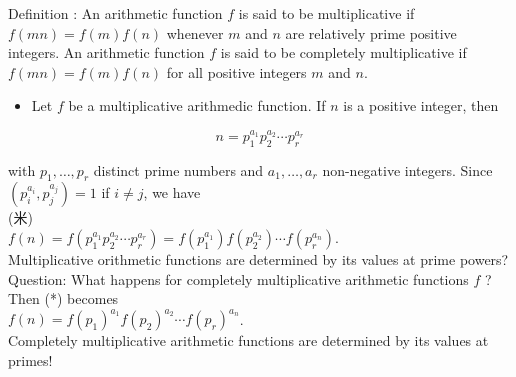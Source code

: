\documentclass[10pt]{article}
\begin{document}
Definition : An arithmetic function $f$ is said to be multiplicative if $f(m n)=f(m) f(n)$ whenever $m$ and $n$ are relatively prime positive integers. An arithmetic function $f$ is said to be completely multiplicative if $f(m n)=f(m) f(n)$ for all positive integers $m$ and $n$.

\begin{itemize}
  \item Let $f$ be a multiplicative arithmedic function. If $n$ is a positive integer, then
\end{itemize}


\begin{equation*}
n=p_{1}^{a_{1}} p_{2}^{a_{2}} \cdots p_{r}^{a_{r}} \tag{10}
\end{equation*}


with $p_{1}, \ldots, p_{r}$ distinct prime numbers and $a_{1}, \ldots, a_{r}$ non-negative integers. Since $\left(p_{i}^{a_{i}}, p_{j}^{a_{j}}\right)=1$ if $i \neq j$, we have\\
(米)\\
$f(n)=f\left(p_{1}^{a_{1}} p_{2}^{a_{2}} \cdots p_{r}^{a_{r}}\right)=f\left(p_{1}^{a_{1}}\right) f\left(p_{2}^{a_{2}}\right) \cdots f\left(p_{r}^{a_{n}}\right)$.\\
Multiplicative orithmetic functions are determined by its values at prime powers?\\
Question: What happens for completely multiplicative arithmetic functions $f$ ?\\
Then (*) becomes\\
$f(n)=f\left(p_{1}\right)^{a_{1}} f\left(p_{2}\right)^{a_{2}} \cdots f\left(p_{r}\right)^{a_{n}}$.\\
Completely multiplicative arithmetic functions are determined by its values at primes!
\end{document}
